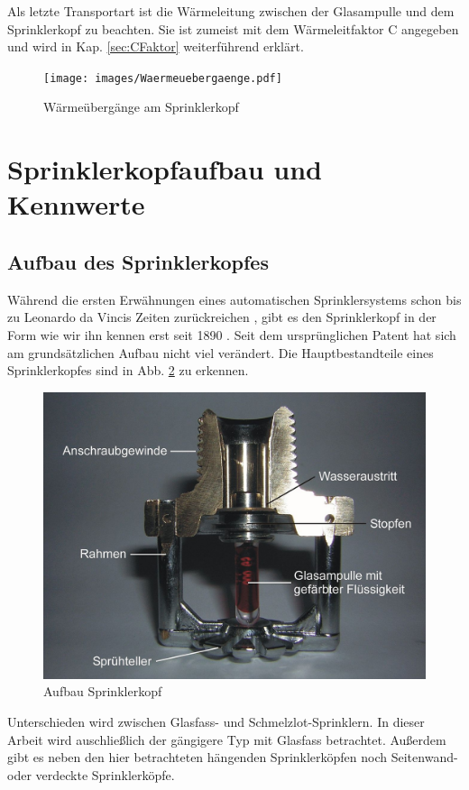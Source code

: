 Als letzte Transportart ist die Wärmeleitung zwischen der Glasampulle und dem Sprinklerkopf zu beachten. Sie ist zumeist mit dem Wärmeleitfaktor C angegeben und wird in Kap. \ref{sec:CFaktor} weiterführend erklärt.

\begin{figure}
    \centering
    \texttt{[image: images/Waermeuebergaenge.pdf]}
    \caption{Wärmeübergänge am Sprinklerkopf \cite{SFPE5th}}
    \label{fig:waermeuebergaenge}
\end{figure}







\section{Sprinklerkopfaufbau und Kennwerte}
\label{sec:Sprinklerkennwerte}
\subsection{Aufbau des Sprinklerkopfes}
\label{sec:AufbauSprinkler}
Während die ersten Erwähnungen eines automatischen Sprinklersystems schon bis zu Leonardo da Vincis Zeiten zurückreichen \cite{WikiSprinkler}, gibt es den Sprinklerkopf in der Form wie wir ihn kennen erst seit 1890 \cite{Patent}. Seit dem ursprünglichen Patent hat sich am grundsätzlichen Aufbau nicht viel verändert. Die Hauptbestandteile eines Sprinklerkopfes sind in Abb. \ref{fig:AufbauSprinklerkopf} zu erkennen.
\begin{figure}
    \centering
    \includegraphics{images/sprinklerkopf.jpg}
    \caption{Aufbau Sprinklerkopf \cite{Sprinklerkopf}}
    \label{fig:AufbauSprinklerkopf}
\end{figure}
Unterschieden wird zwischen Glasfass- und Schmelzlot-Sprinklern. In dieser Arbeit wird auschließlich der gängigere Typ mit Glasfass betrachtet. Außerdem gibt es neben den hier betrachteten hängenden Sprinklerköpfen noch \zB Seitenwand- oder verdeckte Sprinklerköpfe.

